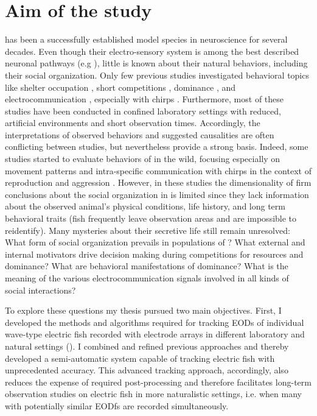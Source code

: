 \section{Aim of the study}

\lepto{} has been a successfully established model species in neuroscience for several decades. Even though their electro-sensory system is among the best described neuronal pathways (e.g \citealp{Benda2005, Bullock2006, Sinz2020}), little is known about their natural behaviors, including their social organization. Only few previous studies investigated behavioral topics like shelter occupation \citep{Dunlap2002, Stamper2010}, short competitions \citep{Hupe2008, Triefenbach2008}, dominance \citep{Dunlap2002}, and electrocommunication \citep{Smith2013, Henninger2018}, especially with chirps \citep{Engler2000}. Furthermore, most of these studies have been conducted in confined laboratory settings with reduced, artificial environments and short observation times. Accordingly, the interpretations of observed behaviors and suggested causalities are often conflicting between studies, but nevertheless provide a strong basis. Indeed, some studies started to evaluate behaviors of \lepto{} in the wild, focusing especially on movement patterns and intra-specific communication with chirps in the context of reproduction and aggression \citep{Henninger2018, Henninger2020}. However, in these studies the dimensionality of firm conclusions about the social organization in \lepto{} is limited since they lack information about the observed animal's physical conditions, life history, and long term behavioral traits (fish frequently leave observation areas and are impossible to reidentify). Many mysteries about their secretive life still remain unresolved: What form of social organization prevails in populations of \lepto{}? What external and internal motivators drive decision making during competitions for resources and dominance? What are behavioral manifestations of dominance? What is the meaning of the various electrocommunication signals involved in all kinds of social interactions?    

To explore these questions my thesis pursued two main objectives. First, I developed the methods and algorithms required for tracking EODs of individual wave-type electric fish recorded with electrode arrays in different laboratory and natural settings (). I combined and refined previous approaches \citep{Madhav2018, Henninger2020} and thereby developed a semi-automatic system capable of tracking electric fish with unprecedented accuracy. This advanced tracking approach, accordingly, also reduces the expense of required post-processing and therefore facilitates long-term observation studies on electric fish in more naturalistic settings, i.e. when many with potentially similar EODfs are recorded simultaneously.

